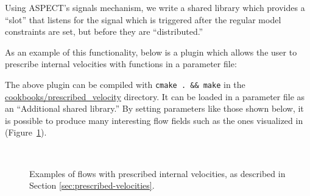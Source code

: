 \documentclass{article}
\newcommand{\aspect}{\textsc{ASPECT}}
\begin{document}
Using \aspect{}'s signals mechanism, we write a shared library which provides a
``slot'' that listens for the signal which is triggered after the regular model
constraints are set, but before they are ``distributed.''

As an example of this functionality, below is a plugin which allows the user to prescribe
internal velocities with functions in a parameter file:


The above plugin can be compiled with \texttt{cmake . \&\& make} in the
\url{cookbooks/prescribed_velocity} directory. It can be loaded in a parameter file
as an ``Additional shared library.'' By setting parameters like those shown below,
it is possible to produce many interesting flow fields such as the ones visualized in
(Figure~\ref{fig:prescribed-velocity}).


\begin{figure}
    \centering
  ~
    \caption{Examples of flows with prescribed internal velocities, as described in Section \ref{sec:prescribed-velocities}.}
    \label{fig:prescribed-velocity}
\end{figure}
\end{document}
